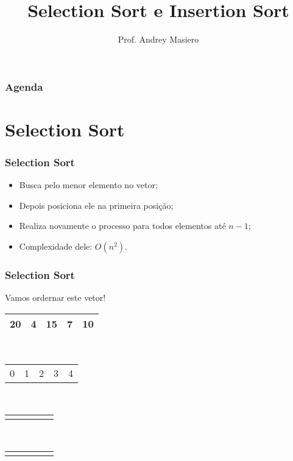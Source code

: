 \documentclass{beamer}
\begin{document}
\title[Selection e Insertion]{Selection Sort e Insertion Sort}
\author{Prof. Andrey Masiero}

\begin{frame}
  \titlepage
\end{frame}

\begin{frame}
  \frametitle{Agenda}
  \tableofcontents
\end{frame}

\section{Selection Sort}

\begin{frame}
	\frametitle{Selection Sort}
    \begin{itemize}[<+->]
        \item Busca pelo menor elemento no vetor;
        \item Depois posiciona ele na primeira posição;
        \item Realiza novamente o processo para todos elementos até $n - 1$;
        \item Complexidade dele: $O(n^2)$.
    \end{itemize}
\end{frame}

\begin{frame}
    \frametitle{Selection Sort}
    \begin{center}
        \LARGE{Vamos ordernar este vetor!}
    \end{center}
    \begin{center}
        \begin{table}
            \begin{tabular}{| p{0.25cm} | p{0.25cm} | p{0.25cm} | p{0.25cm} | p{0.25cm} |}
                \hline
                20 & 4 & 15 & 7 & 10 \\ \hline
            \end{tabular} \\
            \begin{tabular}{p{0.25cm} p{0.25cm} p{0.25cm} p{0.25cm} p{0.25cm}}
                0 & 1 & 2 & 3 & 4
            \end{tabular} \\
            \begin{tabular}{p{0.25cm} p{0.25cm} p{0.25cm} p{0.25cm} p{0.25cm}}
                & & & &
            \end{tabular} \\
            \begin{tabular}{p{0.25cm} p{0.25cm} p{0.25cm} p{0.25cm} p{0.25cm}}
                & & & &
            \end{tabular}
        \end{table}
	\end{center}
\end{frame}
\end{document}
